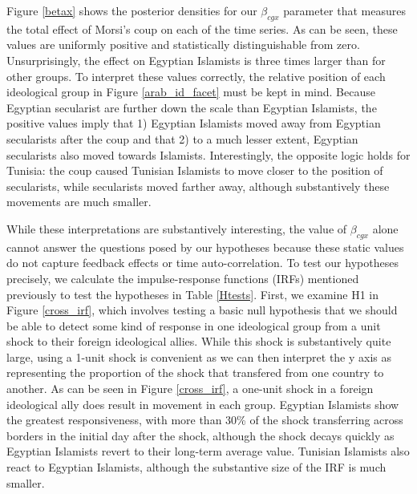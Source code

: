 \documentclass[12pt]{article}
\begin{document}
Figure \ref{betax} shows the posterior densities for our $\beta_{cgx}$ parameter that measures the total effect of Morsi's coup on each of the time series. As can be seen, these values are uniformly positive and statistically distinguishable from zero. Unsurprisingly, the effect on Egyptian Islamists is three times larger than for other groups. To interpret these values correctly, the relative position of each ideological group in Figure \ref{arab_id_facet} must be kept in mind. Because Egyptian secularist are further down the scale than Egyptian Islamists, the positive values imply that 1) Egyptian Islamists moved away from Egyptian secularists after the coup and that 2) to a much lesser extent, Egyptian secularists also moved towards Islamists. Interestingly, the opposite logic holds for Tunisia: the coup caused Tunisian Islamists to move closer to the position of secularists, while secularists moved farther away, although substantively these movements are much smaller. 

While these interpretations are substantively interesting, the value of $\beta_{cgx}$ alone cannot answer the questions posed by our hypotheses because these static values do not capture feedback effects or time auto-correlation. To test our hypotheses precisely, we calculate the impulse-response functions (IRFs) mentioned previously to test the hypotheses in Table \ref{Htests}. First, we examine H1 in Figure \ref{cross_irf}, which involves testing a basic null hypothesis that we should be able to detect some kind of response in one ideological group from a unit shock to their foreign ideological allies. While this shock is substantively quite large, using a 1-unit shock is convenient as we can then interpret the y axis as representing the proportion of the shock that transfered from one country to another. As can be seen in Figure \ref{cross_irf}, a one-unit shock in a foreign ideological ally does result in movement in each group. Egyptian Islamists show the greatest responsiveness, with more than 30\% of the shock transferring across borders in the initial day after the shock, although the shock decays quickly as Egyptian Islamists revert to their long-term average value. Tunisian Islamists also react to Egyptian Islamists, although the substantive size of the IRF is much smaller.
\end{document}
